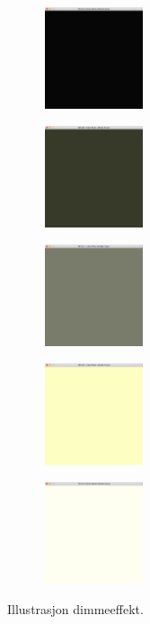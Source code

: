 \begin{figure}[h]
\centering
\begin{subfigure}{0.23\textwidth}
\includegraphics[width=3cm, height=3cm]{fig/light-1}
\caption{}
\label{fig:light-1}
\end{subfigure}
\begin{subfigure}{0.23\textwidth}
\includegraphics[width=3cm, height=3cm]{fig/light-2}
\caption{}
\label{fig:light-2}
\end{subfigure}
\begin{subfigure}{0.23\textwidth}
\includegraphics[width=3cm, height=3cm]{fig/light-3}
\caption{}
\label{fig:light-3}
\end{subfigure}
\begin{subfigure}{0.23\textwidth}
\includegraphics[width=3cm, height=3cm]{fig/light-4}
\caption{}
\label{fig:light-4}
\end{subfigure}
\begin{subfigure}{0.23\textwidth}
\includegraphics[width=3cm, height=3cm]{fig/light-5}
\caption{}
\label{fig:light-5}
\end{subfigure}
\caption{Illustrasjon dimmeeffekt.}
\label{fig:light}
\end{figure}

